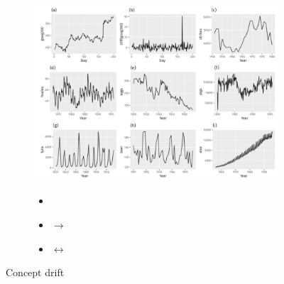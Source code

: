\begin{figure}[H]
  \vspace*{0.5cm}
  \begin{subfigure}{0.47\textwidth}
    \centering
    \includegraphics[width=\textwidth]{assets/sl/cross_val__out_of_time_model_drift.png}
  \end{subfigure}
  \hspace*{0.05\textwidth}
  \begin{subfigure}{0.47\textwidth}
    \centering
    \begin{itemize}
      \item {}
      \item $\rightarrow$ 
      \item {} $\leftrightarrow$ 
    \end{itemize}
  \end{subfigure}

  \caption{Concept drift}
  \label{fig:7_concept_drift}
\end{figure}


